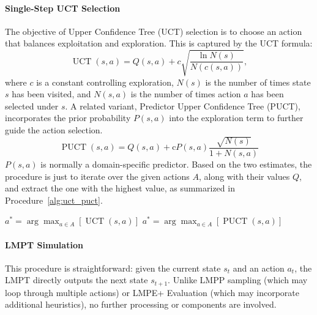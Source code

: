\paragraph{Single-Step UCT Selection}
The objective of Upper Confidence Tree (UCT) selection is to choose an action that balances exploitation and exploration. This is captured by the UCT formula:
\begin{equation} \label{eq:uct}
    \operatorname{UCT}\left(s, a\right) = Q(s, a)+c \sqrt{\frac{\ln N(s)}{N(c(s, a))}},
\end{equation}
where \(c\) is a constant controlling exploration,
\(N(s)\) is the number of times state \(s\) has been visited, %
and \(N(s,a)\) is the number of times action \(a\) has been selected under \(s\).
A related variant, Predictor Upper Confidence Tree (PUCT), incorporates the prior probability \(P(s,a)\) into the exploration term to further guide the action selection. 
\begin{equation}
\operatorname{PUCT}\left(s, a\right)=Q\left(s, a\right)+\mathrm{c} P(s, a) \frac{\sqrt{ N\left(s\right)}}{1+N\left(s, a\right)}
    \label{eq:puct}
\end{equation}
$P(s, a)$ is normally a domain-specific predictor.
Based on the two estimates, the procedure is just to iterate over the given actions $A$, along with their values $Q$, and extract the one with the highest value, as summarized in Procedure~\ref{alg:uct_puct}.
\begin{procedure}[h!]
\caption{Single-Step UCT Selection} 
\label{alg:uct_puct}
\small
\noindent
\begin{algorithmic}[1]
        \State $a^*=\arg \max _{a \in A}\left[\operatorname{UCT}(s, a)  \right]$
    \EndProcedure
        \State $a^*=\arg \max _{a \in A}\left[\operatorname{PUCT}(s, a)\right]$
    \EndProcedure
\end{algorithmic}
\end{procedure}

\paragraph{LMPT Simulation}
This procedure is straightforward: given the current state $s_t$ and an action $a_t$, the LMPT directly outputs the next state $s_{t+1}$. Unlike LMPP sampling (which may loop through multiple actions) or LMPE+ Evaluation (which may incorporate additional heuristics), no further processing or components are involved. 

